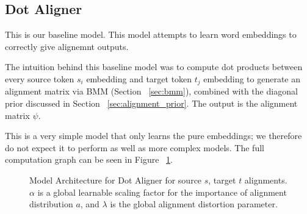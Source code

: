 \documentclass[twoside,twocolumn]{article}
\begin{document}
\subsection{Dot Aligner}
This is our baseline model. This model attempts to learn word embeddings
to correctly give alignemnt outputs.

The intuition behind this baseline model was to compute dot products
between every source token $s_i$ embedding and target token $t_j$ embedding
to generate an alignment matrix via BMM (Section ~\ref{sec:bmm}), combined
with the diagonal prior discussed in Section ~\ref{sec:alignment_prior}.
The output is the alignment matrix $\psi$.

This is a very simple model that only learns the pure embeddings; we
therefore do not expect it to perform as well as more complex models.
The full computation graph can be seen in Figure ~\ref{fig:dot_aligner}.

\begin{figure}
  \centering
  \caption{Model Architecture for Dot Aligner for source $s$,
  target $t$ alignments. $\alpha$ is a global learnable scaling factor for
  the importance of alignment distribution $a$, and $\lambda$ is the
  global alignment distortion parameter.}
  \label{fig:dot_aligner}
\end{figure}
\end{document}

